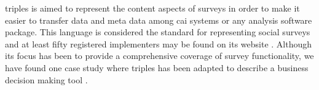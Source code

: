 

	\gls{triples} is aimed to represent the content aspects of surveys \cite{book:triplesxml} in order to make it easier to transfer data and meta data among \gls{cai} systems or any analysis software package. This language is considered the standard for representing social surveys and at least fifty registered implementers may be found on its website \cite{web:triples}. Although its focus has been to provide a comprehensive coverage of survey functionality, we have found one case study where \gls{triples} has been adapted to describe a business decision making tool \cite{proc:wright07}.